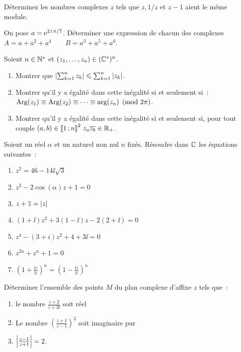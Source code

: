 \begin{exercice}
    Déterminez les nombres complexes \(z\) tels que \(z, 1/z\) et \(z-1\) aient 
    le même module.
\end{exercice}
\begin{exercice}
    On pose \(a=\operatorname{e}^{2\operatorname{i}\pi/7}\). Déterminer une expression de chacun des 
    complexes \(A = a+a^2+a^4 \qquad B = a^3+a^5+a^6\).
\end{exercice}
\begin{exercice}
    Soient \(n \in \mathbb{N}^{*}\) et \((z_1, \ldots, z_n) \in (\mathbb{C}^{*})^n\).
    \begin{enumerate}
        \item Montrer que \( \left\lvert\sum_{k=1}^n z_k\right\rvert \leqslant \sum_{k=1}^n 
            \left\lvert z_k\right\rvert\).
        \item Montrer qu'il y a égalité dans cette inégalité si et seulement 
            si~: \(\operatorname{Arg}(z_1) \equiv \operatorname{Arg}(z_2) \equiv \cdots \equiv \arg(z_n) 
            \pmod{2\pi}\).
        \item Montrer qu'il y a égalité dans cette inégalité si et seulement si, 
            pour tout couple \((a,b) \in \mathopen{\llbracket}1\mathclose{}\mathpunct{};n\mathclose{\rrbracket}^2 \ z_a 
            \overline{z_b} \in \mathbb{R}_{+}\).
    \end{enumerate}
\end{exercice}
\begin{exercice}
    Soient un réel \(\alpha\) et un naturel non nul \(n\) fixés. Résoudre dans 
    \(\mathbb{C}\) les équations suivantes~:
    \begin{multicols}{2}
        \begin{enumerate}
            \item \(z^2 = 46-14\ii\sqrt{3}\)
            \item \(z^2-2\cos(\alpha)z+1=0\)
            \item \(z+\overline{z}=\left\lvert z\right\rvert\)
            \item \((1+\ii)z^2+3(1-\ii)z-2(2+\ii)=0\)
            \item \(z^4-(3+i)z^2+4+3\ii=0\)
            \item \(z^{2n}+z^n+1=0\)
            \item \(\left(1+\frac{\ii z}{n}\right)^n = \left(1-\frac{\ii 
                z}{n}\right)^n\)
        \end{enumerate}
    \end{multicols}
\end{exercice}
\begin{exercice}
    Déterminer l'ensemble des points \(M\) du plan complexe d'affixe \(z\) tels 
    que~:
    \begin{enumerate}
        \item le nombre \(\frac{z+2}{z+3\ii}\) soit réel
        \item Le nombre \(\left(\frac{z+1}{z-1}\right)^2\) soit imaginaire pur
        \item \(\left\lvert\frac{z-1}{z+1}\right\rvert=2\).
    \end{enumerate}
\end{exercice}
